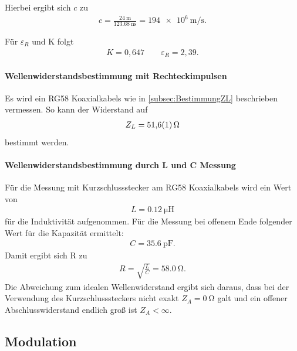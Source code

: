 \documentclass[a4paper,twoside,final]{article}
\begin{document}
Hierbei ergibt sich $c$ zu
\begin{align}
c = \frac{\SI{24}{\metre}}{\SI{123,68}{\nano\second}}= \SI{194e6}{\metre\per\second}.
\end{align}

Für $\varepsilon_R$ und K folgt
\begin{align}
K = 0,647 \qquad \varepsilon_R = 2,39.
\end{align}

\paragraph{Wellenwiderstandsbestimmung mit Rechteckimpulsen}
Es wird ein RG58 Koaxialkabels wie in \ref{subsec:BestimmungZL} beschrieben vermessen. So kann der Widerstand auf
\begin{align}
Z_L = \SI{51,6 \pm 0,1}{\ohm}
\end{align}
bestimmt werden.

\paragraph{Wellenwiderstandsbestimmung durch L und C Messung}
Für die Messung mit Kurzschlussstecker am RG58 Koaxialkabels wird ein Wert von
\begin{align}
L = \SI{0,12}{\micro\henry}
\end{align}
für die Induktivität aufgenommen. Für die Messung bei offenem Ende folgender Wert für die Kapazität ermittelt:
\begin{align}
C = \SI{35,6}{\pico\farad}.
\end{align}
Damit ergibt sich R zu
\begin{align}
R = \sqrt{\frac{L}{C}} =  \SI{58,0}{\ohm}.
\end{align}
Die Abweichung zum idealen Wellenwiderstand ergibt sich daraus, dass bei der Verwendung des Kurzschlusssteckers nicht exakt $Z_A = \SI{0}{\ohm}$ galt und ein offener Abschlusswiderstand  endlich groß ist $Z_A < \infty$.
\subsection{Modulation}
\end{document}
